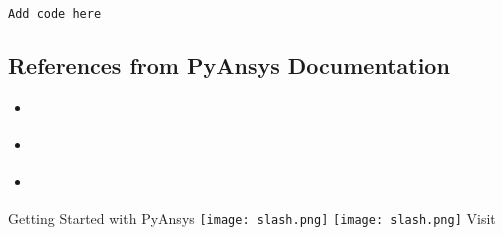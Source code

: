 \documentclass[9pt,landscape]{article}
\begin{document}
\begin{multicols}{3}
\begin{lstlisting}[language=Python]
Add code here

\end{lstlisting}


\subsection{References from PyAnsys Documentation}
\begin{itemize}
\item \href{usefullinks}{\color{blue}{name of link}}
\item \href{useful_links}{\color{blue}{name of link}}
\item \href{useful_links}{\color{blue}{name of link}}
\end{itemize}
\end{multicols}

\vspace{-0.15cm}
\noindent\makebox[\linewidth]{\rule{\paperwidth}{4pt}}
\begin{center}
Getting Started with PyAnsys \texttt{[image: slash.png]} \href{https://github.com/pyansys}{\color{blue}{PyAnsys on GitHub}} \texttt{[image: slash.png]} Visit 
\end{center}
\end{document}
